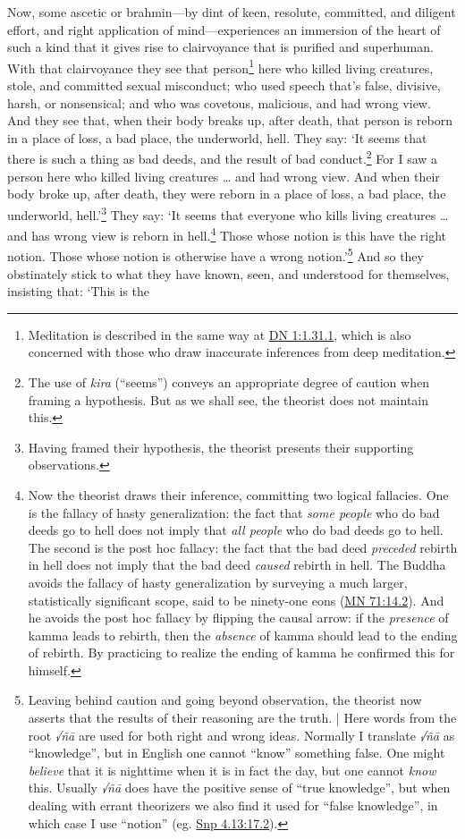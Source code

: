 \documentclass[12pt,openany]{book}%
\begin{document}
Now, some ascetic or brahmin—by dint of keen, resolute, committed, and diligent effort, and right application of mind—experiences an immersion of the heart of such a kind that it gives rise to clairvoyance that is purified and superhuman. With that clairvoyance they see that person\footnote{Meditation is described in the same way at \href{https://suttacentral.net/dn1/en/sujato\#1.31.1}{DN 1:1.31.1}, which is also concerned with those who draw inaccurate inferences from deep meditation. } here who killed living creatures, stole, and committed sexual misconduct; who used speech that’s false, divisive, harsh, or nonsensical; and who was covetous, malicious, and had wrong view. And they see that, when their body breaks up, after death, that person is reborn in a place of loss, a bad place, the underworld, hell. They say: ‘It seems that there is such a thing as bad deeds, and the result of bad conduct.\footnote{The use of \textit{kira} (“seems”) conveys an appropriate degree of caution when framing a hypothesis. But as we shall see, the theorist does not maintain this. } For I saw a person here who killed living creatures … and had wrong view. And when their body broke up, after death, they were reborn in a place of loss, a bad place, the underworld, hell.’\footnote{Having framed their hypothesis, the theorist presents their supporting observations. } They say: ‘It seems that everyone who kills living creatures … and has wrong view is reborn in hell.\footnote{Now the theorist draws their inference, committing two logical fallacies. One is the fallacy of hasty generalization: the fact that \emph{some people} who do bad deeds go to hell does not imply that \emph{all people} who do bad deeds go to hell. The second is the post hoc fallacy: the fact that the bad deed \emph{preceded} rebirth in hell does not imply that the bad deed \emph{caused} rebirth in hell. The Buddha avoids the fallacy of hasty generalization by surveying a much larger, statistically significant scope, said to be ninety-one eons (\href{https://suttacentral.net/mn71/en/sujato\#14.2}{MN 71:14.2}). And he avoids the post hoc fallacy by flipping the causal arrow: if the \emph{presence} of kamma leads to rebirth, then the \emph{absence} of kamma should lead to the ending of rebirth. By practicing to realize the ending of kamma he confirmed this for himself. } Those whose notion is this have the right notion. Those whose notion is otherwise have a wrong notion.’\footnote{Leaving behind caution and going beyond observation, the theorist now asserts that the results of their reasoning are the truth. | Here words from the root \textit{√\textsanskrit{ñā}} are used for both right and wrong ideas. Normally I translate \textit{√\textsanskrit{ñā}} as “knowledge”, but in English one cannot “know” something false. One might \emph{believe} that it is nighttime when it is in fact the day, but one cannot \emph{know} this. Usually \textit{√\textsanskrit{ñā}} does have the positive sense of “true knowledge”, but when dealing with errant theorizers we also find it used for “false knowledge”, in which case I use “notion” (eg. \href{https://suttacentral.net/snp4.13/en/sujato\#17.2}{Snp 4.13:17.2}). } And so they obstinately stick to what they have known, seen, and understood for themselves, insisting that: ‘This is the 
\end{document}
